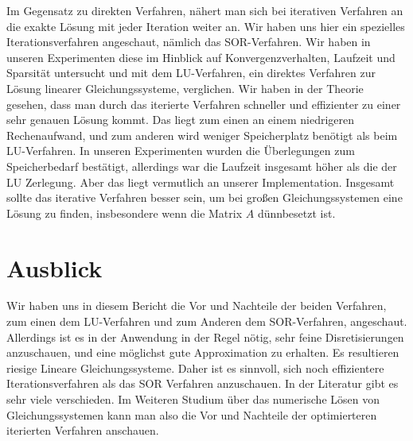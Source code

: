 \documentclass[smallheadings]{scrartcl}
\theoremstyle{definition}
\begin{document}
Im Gegensatz zu direkten Verfahren, nähert man sich bei iterativen Verfahren an die exakte Lösung mit jeder Iteration weiter an.  Wir haben uns hier ein spezielles Iterationsverfahren angeschaut, nämlich das SOR-Verfahren. Wir haben in unseren Experimenten diese im Hinblick auf Konvergenzverhalten, Laufzeit und Sparsität untersucht und mit dem LU-Verfahren, ein direktes Verfahren zur Lösung linearer Gleichungssysteme, verglichen.  Wir haben in der Theorie gesehen, dass man durch das iterierte Verfahren schneller und effizienter zu einer sehr genauen Lösung kommt.  Das liegt zum einen an einem niedrigeren Rechenaufwand, und zum anderen wird weniger Speicherplatz benötigt als beim LU-Verfahren.  In unseren Experimenten wurden die Überlegungen zum Speicherbedarf bestätigt, allerdings war die Laufzeit insgesamt höher als die der LU Zerlegung.  Aber das liegt vermutlich an unserer Implementation. Insgesamt sollte das iterative Verfahren besser sein, um bei großen Gleichungssystemen eine Lösung zu finden, insbesondere wenn die Matrix $A$ dünnbesetzt ist. 



\section{Ausblick}
Wir haben uns in diesem Bericht die Vor und Nachteile der beiden Verfahren, zum einen dem LU-Verfahren und zum Anderen dem SOR-Verfahren, angeschaut.  Allerdings ist es in der Anwendung in der Regel nötig,  sehr feine Disretisierungen anzuschauen, und eine möglichst gute Approximation zu erhalten.  Es resultieren riesige Lineare Gleichungssysteme. Daher ist es sinnvoll, sich noch effizientere Iterationsverfahren als das SOR Verfahren anzuschauen. In der Literatur gibt es sehr viele verschieden. Im Weiteren Studium über das numerische Lösen von Gleichungssystemen kann man also die Vor und Nachteile der optimierteren iterierten Verfahren anschauen. 



\printbibliography

\end{document}
